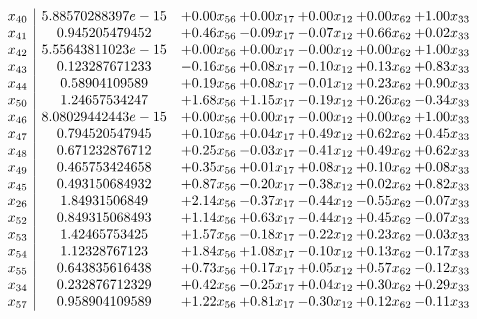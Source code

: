 \documentclass[8pt]{article}
\begin{document}
\[\begin{array}{c| c c@{\hskip 2pt} c@{\hskip 2pt} c@{\hskip 2pt} c@{\hskip 2pt} c@{\hskip 2pt} }
 x_{40}   &  5.88570288397e-15 & +  0.00 x_{56} & +  0.00 x_{17} & +  0.00 x_{12} & +  0.00 x_{62} & +  1.00 x_{33}\\
 x_{41}   &  0.945205479452 & +  0.46 x_{56} & -0.09 x_{17} & -0.07 x_{12} & +  0.66 x_{62} & +  0.02 x_{33}\\
 x_{42}   &  5.55643811023e-15 & +  0.00 x_{56} & +  0.00 x_{17} & -0.00 x_{12} & +  0.00 x_{62} & +  1.00 x_{33}\\
 x_{43}   &  0.123287671233 & -0.16 x_{56} & +  0.08 x_{17} & -0.10 x_{12} & +  0.13 x_{62} & +  0.83 x_{33}\\
 x_{44}   &  0.58904109589 & +  0.19 x_{56} & +  0.08 x_{17} & -0.01 x_{12} & +  0.23 x_{62} & +  0.90 x_{33}\\
 x_{50}   &  1.24657534247 & +  1.68 x_{56} & +  1.15 x_{17} & -0.19 x_{12} & +  0.26 x_{62} & -0.34 x_{33}\\
 x_{46}   &  8.08029442443e-15 & +  0.00 x_{56} & +  0.00 x_{17} & -0.00 x_{12} & +  0.00 x_{62} & +  1.00 x_{33}\\
 x_{47}   &  0.794520547945 & +  0.10 x_{56} & +  0.04 x_{17} & +  0.49 x_{12} & +  0.62 x_{62} & +  0.45 x_{33}\\
 x_{48}   &  0.671232876712 & +  0.25 x_{56} & -0.03 x_{17} & -0.41 x_{12} & +  0.49 x_{62} & +  0.62 x_{33}\\
 x_{49}   &  0.465753424658 & +  0.35 x_{56} & +  0.01 x_{17} & +  0.08 x_{12} & +  0.10 x_{62} & +  0.08 x_{33}\\
 x_{45}   &  0.493150684932 & +  0.87 x_{56} & -0.20 x_{17} & -0.38 x_{12} & +  0.02 x_{62} & +  0.82 x_{33}\\
 x_{26}   &  1.84931506849 & +  2.14 x_{56} & -0.37 x_{17} & -0.44 x_{12} & -0.55 x_{62} & -0.07 x_{33}\\
 x_{52}   &  0.849315068493 & +  1.14 x_{56} & +  0.63 x_{17} & -0.44 x_{12} & +  0.45 x_{62} & -0.07 x_{33}\\
 x_{53}   &  1.42465753425 & +  1.57 x_{56} & -0.18 x_{17} & -0.22 x_{12} & +  0.23 x_{62} & -0.03 x_{33}\\
 x_{54}   &  1.12328767123 & +  1.84 x_{56} & +  1.08 x_{17} & -0.10 x_{12} & +  0.13 x_{62} & -0.17 x_{33}\\
 x_{55}   &  0.643835616438 & +  0.73 x_{56} & +  0.17 x_{17} & +  0.05 x_{12} & +  0.57 x_{62} & -0.12 x_{33}\\
 x_{34}   &  0.232876712329 & +  0.42 x_{56} & -0.25 x_{17} & +  0.04 x_{12} & +  0.30 x_{62} & +  0.29 x_{33}\\
 x_{57}   &  0.958904109589 & +  1.22 x_{56} & +  0.81 x_{17} & -0.30 x_{12} & +  0.12 x_{62} & -0.11 x_{33}\\

\end{array}\]
\end{document}
